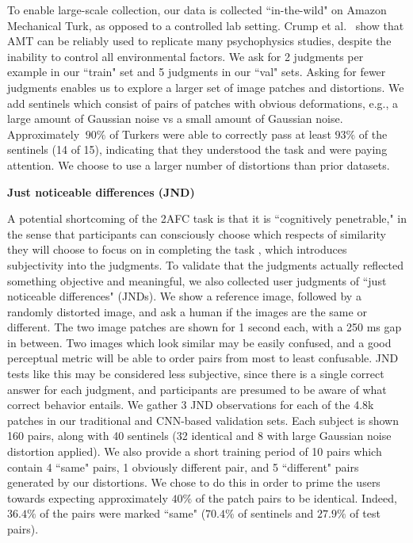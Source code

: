 To enable large-scale collection, our data is collected ``in-the-wild" on Amazon Mechanical Turk, as opposed to a controlled lab setting. Crump et al.~\cite{crump2013evaluating} show that AMT can be reliably used to replicate many psychophysics studies, despite the inability to control all environmental factors. We ask for 2 judgments per example in our ``train" set and 5 judgments in our ``val" sets. Asking for fewer judgments enables us to explore a larger set of image patches and distortions. We add sentinels which consist of pairs of patches with obvious deformations, e.g., a large amount of Gaussian noise vs a small amount of Gaussian noise. Approximately $~90\%$ of Turkers were able to correctly pass at least $93\%$ of the sentinels (14 of 15), indicating that they understood the task and were paying attention. We choose to use a larger number of distortions than prior datasets.

  \textbf{Just noticeable differences (JND)} \ \ 

A potential shortcoming of the 2AFC task is that it is ``cognitively penetrable," in the sense that participants can consciously choose which respects of similarity they will choose to focus on in completing the task \cite{medin1993respects}, which introduces subjectivity into the judgments. To validate that the judgments actually reflected something objective and meaningful, we also collected user judgments of ``just noticeable differences" (JNDs). We show a reference image, followed by a randomly distorted image, and ask a human if the images are the same or different. The two image patches are shown for 1 second each, with a 250 ms gap in between. Two images which look similar may be easily confused, and a good perceptual metric will be able to order pairs from most to least confusable. JND tests like this may be considered less subjective, since there is a single correct answer for each judgment, and participants are presumed to be aware of what correct behavior entails. We gather 3 JND observations for each of the 4.8k patches in our traditional and CNN-based validation sets. Each subject is shown 160 pairs, along with 40 sentinels (32 identical and 8 with large Gaussian noise distortion applied). We also provide a short training period of 10 pairs which contain 4 ``same" pairs, 1 obviously different pair, and 5 ``different" pairs generated by our distortions. We chose to do this in order to prime the users towards expecting approximately $40\%$ of the patch pairs to be identical. Indeed, $36.4\%$ of the pairs were marked ``same" ($70.4\%$ of sentinels and $27.9\%$ of test pairs).

